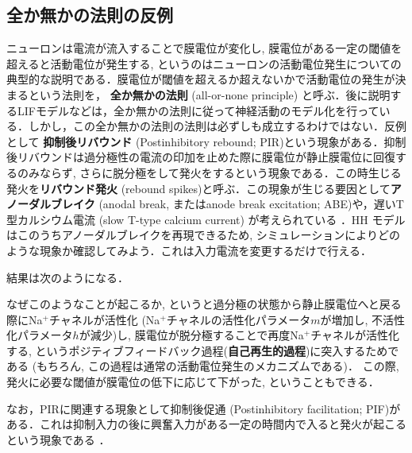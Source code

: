 \subsection{全か無かの法則の反例}
ニューロンは電流が流入することで膜電位が変化し, 膜電位がある一定の閾値を超えると活動電位が発生する, というのはニューロンの活動電位発生についての典型的な説明である．膜電位が閾値を超えるか超えないかで活動電位の発生が決まるという法則を， \textbf{全か無かの法則} (all-or-none principle) と呼ぶ．後に説明するLIFモデルなどは，全か無かの法則に従って神経活動のモデル化を行っている．しかし，この全か無かの法則の法則は必ずしも成立するわけではない．反例として \textbf{抑制後リバウンド} (Postinhibitory rebound; PIR)という現象がある．抑制後リバウンドは過分極性の電流の印加を止めた際に膜電位が静止膜電位に回復するのみならず, さらに脱分極をして発火をするという現象である．この時生じる発火を\textbf{リバウンド発火} (rebound spikes)と呼ぶ．この現象が生じる要因として\textbf{アノーダルブレイク} (anodal break, またはanode break excitation; ABE)や，遅いT型カルシウム電流 (slow T-type calcium current) が考えられている \cite{Chik2004-ka}．HH モデルはこのうちアノーダルブレイクを再現できるため, シミュレーションによりどのような現象か確認してみよう．これは入力電流を変更するだけで行える．

結果は次のようになる．


なぜこのようなことが起こるか, というと過分極の状態から静止膜電位へと戻る際にNa$^+$チャネルが活性化 (Na$^+$チャネルの活性化パラメータ$m$が増加し, 不活性化パラメータ$h$が減少)し, 膜電位が脱分極することで再度Na$^+$チャネルが活性化する, というポジティブフィードバック過程(\textbf{自己再生的過程})に突入するためである (もちろん, この過程は通常の活動電位発生のメカニズムである)． この際, 発火に必要な閾値が膜電位の低下に応じて下がった, ということもできる．

なお，PIRに関連する現象として抑制後促通 (Postinhibitory facilitation; PIF)がある．これは抑制入力の後に興奮入力がある一定の時間内で入ると発火が起こるという現象である \cite{Dodla2006-fj} \cite{Dodla2013-dp}．
